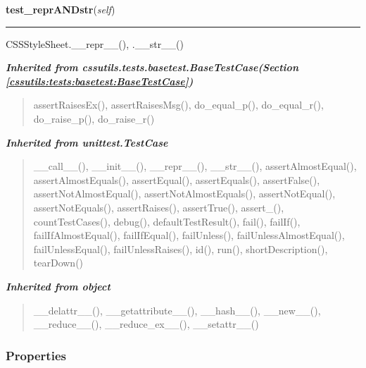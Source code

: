     \vspace{0.5ex}

\hspace{.8\funcindent}\begin{boxedminipage}{\funcwidth}

    \raggedright \textbf{test\_reprANDstr}(\textit{self})

    \vspace{-1.5ex}

    \rule{\textwidth}{0.5\fboxrule}
\setlength{\parskip}{2ex}
    CSSStyleSheet.\_\_repr\_\_(), .\_\_str\_\_()

\setlength{\parskip}{1ex}
    \end{boxedminipage}


\large{\textbf{\textit{Inherited from cssutils.tests.basetest.BaseTestCase\textit{(Section \ref{cssutils:tests:basetest:BaseTestCase})}}}}

\begin{quote}
assertRaisesEx(), assertRaisesMsg(), do\_equal\_p(), do\_equal\_r(), do\_raise\_p(), do\_raise\_r()
\end{quote}

\large{\textbf{\textit{Inherited from unittest.TestCase}}}

\begin{quote}
\_\_call\_\_(), \_\_init\_\_(), \_\_repr\_\_(), \_\_str\_\_(), assertAlmostEqual(), assertAlmostEquals(), assertEqual(), assertEquals(), assertFalse(), assertNotAlmostEqual(), assertNotAlmostEquals(), assertNotEqual(), assertNotEquals(), assertRaises(), assertTrue(), assert\_(), countTestCases(), debug(), defaultTestResult(), fail(), failIf(), failIfAlmostEqual(), failIfEqual(), failUnless(), failUnlessAlmostEqual(), failUnlessEqual(), failUnlessRaises(), id(), run(), shortDescription(), tearDown()
\end{quote}

\large{\textbf{\textit{Inherited from object}}}

\begin{quote}
\_\_delattr\_\_(), \_\_getattribute\_\_(), \_\_hash\_\_(), \_\_new\_\_(), \_\_reduce\_\_(), \_\_reduce\_ex\_\_(), \_\_setattr\_\_()
\end{quote}


  \subsubsection{Properties}

